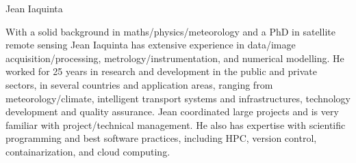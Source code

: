\begin{participant}[gender=male]{Jean Iaquinta}






  \medskip 
  
  With a solid background in maths/physics/meteorology and a PhD in satellite remote sensing Jean Iaquinta has extensive experience in data/image acquisition/processing, metrology/instrumentation, and numerical modelling. He worked for 25 years in research and development in the public and private sectors, in several countries and application areas, ranging from meteorology/climate, intelligent transport systems and infrastructures, technology development and quality assurance. Jean coordinated large projects and is very familiar with project/technical management. He also has expertise with scientific programming and best software practices, including HPC, version control, containarization, and cloud computing. 

\end{participant}

